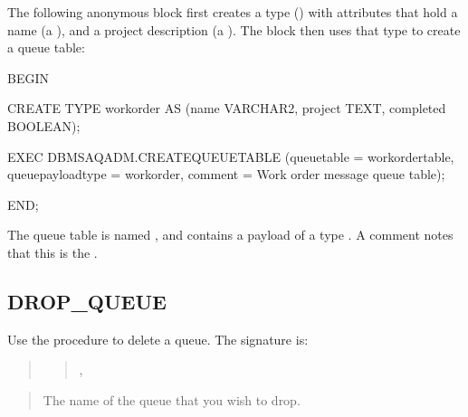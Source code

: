 \documentclass[letterpaper,10pt,english,openany,oneside]{sphinxmanual}
\begin{document}

The following anonymous block first creates a type () with
attributes that hold a name (a ), and a project description (a
). The block then uses that type to create a queue table:

%
\begin{sphinxVerbatim}[commandchars=\\\{\}]
BEGIN

CREATE TYPE work\PYGZus{}order AS (name VARCHAR2, project TEXT, completed BOOLEAN);

EXEC DBMS\PYGZus{}AQADM.CREATE\PYGZus{}QUEUE\PYGZus{}TABLE
      (queue\PYGZus{}table =\PYGZgt{} \PYGZsq{}work\PYGZus{}order\PYGZus{}table\PYGZsq{},
      queue\PYGZus{}payload\PYGZus{}type =\PYGZgt{} \PYGZsq{}work\PYGZus{}order\PYGZsq{},
      comment =\PYGZgt{} \PYGZsq{}Work order message queue table\PYGZsq{});

END;
\end{sphinxVerbatim}

The queue table is named , and contains a payload of a
type . A comment notes that this is the .

\newpage


\subsection{DROP\_QUEUE}
\label{\detokenize{drop_queue::doc}}\label{\detokenize{drop_queue:drop-queue}}
Use the  procedure to delete a queue. The signature is:
\begin{quote}

\begin{quote}

,

\end{quote}
\end{quote}


\begin{quote}

The name of the queue that you wish to drop.
\end{quote}
\end{document}
